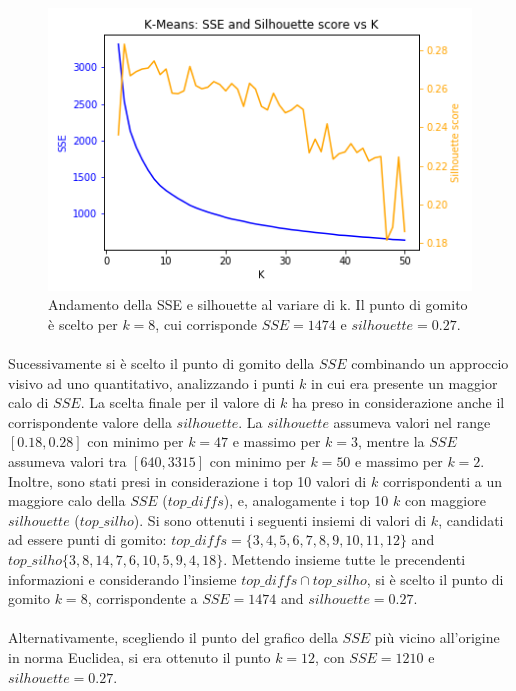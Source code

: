 \documentclass[10pt,a4paper,twocolumn]{report}
\begin{document}
\begin{figure}[hbtp]
\centering
\includegraphics[width=1\columnwidth]{../images/sse_silhouette_vs_k.png}
\caption{Andamento della SSE e silhouette al variare di k. Il punto di gomito è scelto per $k=8$, cui corrisponde $SSE=1474$ e $silhouette=0.27$.}
\label{fig:sse_sil_vs_k}
\end{figure}%

\paragraph{}
Sucessivamente si è scelto il punto di gomito della $SSE$ combinando un approccio visivo ad uno quantitativo, analizzando i punti $k$ in cui era presente un maggior calo di $SSE$. La scelta finale per il valore di $k$ ha preso in considerazione anche il corrispondente valore della $silhouette$. La $silhouette$ assumeva valori nel range $\left[0.18, 0.28\right]$ con minimo per $k=47$ e massimo per $k=3$, mentre la $SSE$ assumeva valori tra $\left[640, 3315\right]$ con minimo per $k=50$ e massimo per $k=2$. Inoltre, sono stati presi in considerazione i top 10 valori di $k$ corrispondenti a un maggiore calo della $SSE$ ($top\_diffs$), e, analogamente i top 10 $k$ con maggiore $silhouette$ ($top\_silho$). Si sono ottenuti i seguenti insiemi di valori di $k$, candidati ad essere punti di gomito: $top\_diffs=\lbrace3,4,5,6,7,8,9,10,11,12\rbrace$ and $top\_silho\lbrace3,8,14,7,6,10,5,9,4,18\rbrace$. Mettendo insieme tutte le precendenti informazioni e considerando l'insieme $top\_diffs \cap top\_silho$, si è scelto il punto di gomito $k=8$, corrispondente a $SSE=1474$ and $silhouette=0.27$.

\paragraph{}
Alternativamente, scegliendo il punto del grafico della $SSE$ più vicino all'origine in norma Euclidea, si era ottenuto il punto $k=12$, con $SSE=1210$ e $silhouette=0.27$.
\end{document}
